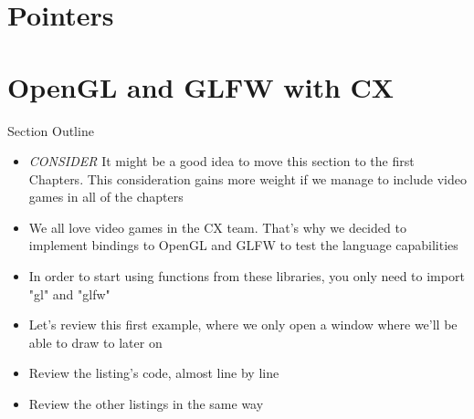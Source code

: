 \documentclass[11pt,fleqn,openany]{book} %
\begin{document}

\chapter{Pointers}
\label{chapter:pointers}


\chapter{OpenGL and GLFW with CX}
\label{chapter:opengl-and-glfw-with-cx}

\begin{remark}
Section Outline
    \begin{itemize}
    \item \emph{CONSIDER} It might be a good idea to move this section to the first Chapters. This consideration gains more weight if we manage to include video games in all of the chapters
    	\item We all love video games in the CX team. That's why we decided to implement bindings to OpenGL and GLFW to test the language capabilities
        \item In order to start using functions from these libraries, you only need to import "gl" and "glfw"
        \item Let's review this first example, where we only open a window where we'll be able to draw to later on
        \item Review the listing's code, almost line by line
        \item Review the other listings in the same way
    \end{itemize}
\end{remark}
\end{document}
